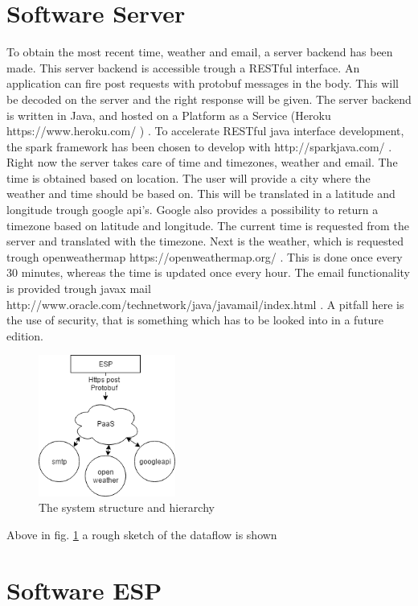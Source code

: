 \section{Software Server}
To obtain the most recent time, weather and email, a server backend has been made. This server backend is accessible trough a RESTful interface. An application can fire post requests with protobuf messages in the body. This will be decoded on the server and the right response will be given. The server backend is written in Java, and hosted on a Platform as a Service (Heroku https://www.heroku.com/ ) . To accelerate RESTful java interface development, the spark framework has been chosen to develop with http://sparkjava.com/ . Right now the server takes care of time and timezones, weather and email. The time is obtained based on location. The user will provide a city where the weather and time should be based on. This will be translated in a latitude and longitude trough google api's. Google also provides a possibility to return a timezone based on latitude and longitude. The current time is requested from the server and translated with the timezone. Next is the weather, which is requested trough openweathermap https://openweathermap.org/ . This is done once every 30 minutes, whereas the time is updated once every hour. The email functionality is provided trough javax mail http://www.oracle.com/technetwork/java/javamail/index.html . A pitfall here is the use of security, that is something which has to be looked into in a future edition.
\begin{figure}[H]
	\centering
	\label{fig:block_server}
	\includegraphics[width=0.4\textwidth]{fig/block_server.png}
	\caption{The system structure and hierarchy}
\end{figure}
Above in fig. \ref{fig:block_server} a rough sketch of the dataflow is shown
\section{Software ESP}
